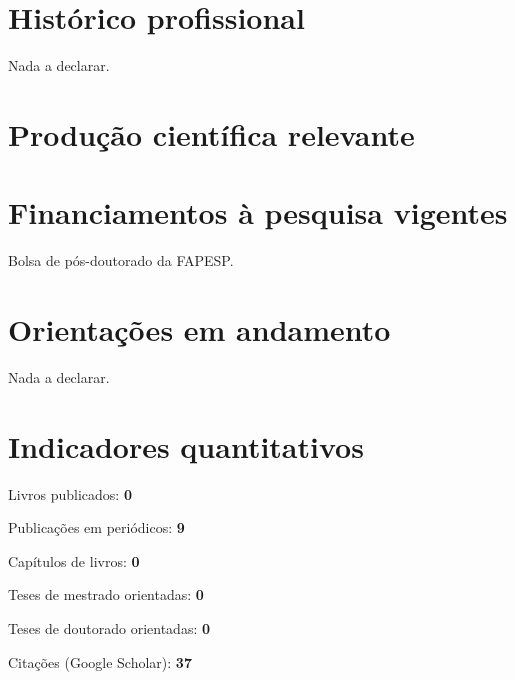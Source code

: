 \documentclass[a4paper ,11pt]{article}
\renewenvironment{enumerate}{
  \begin{list}{}{
    \setlength{\leftmargin}{2em}
  }
}{
  \end{list}
}
\begin{document}

\section{Histórico profissional}
Nada a declarar.

\section{Produção científica relevante}

\renewcommand{\refname}{Artigos}

\nocite{*}
%
%
\printbibliography

\section{Financiamentos à pesquisa vigentes}
Bolsa de pós-doutorado da FAPESP.

\section{Orientações em andamento}
Nada a declarar.

\section{Indicadores quantitativos}
\begin{enumerate}
    \item Livros publicados: \textbf{0}
    \item Publicações em periódicos: \textbf{9}
    \item Capítulos de livros: \textbf{0}
    \item Teses de mestrado orientadas: \textbf{0}
    \item Teses de doutorado orientadas: \textbf{0}
    \item Citações (Google Scholar): \textbf{37}
\end{enumerate}
\end{document}
